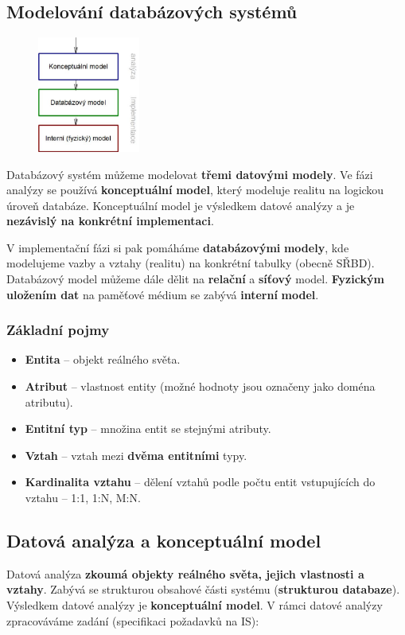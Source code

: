 \subsection{Modelování databázových systémů}
\begin{figure}[H]
	\centering
	\includegraphics[width=0.3\textwidth]{assets/modelovani.png}
\end{figure}

Databázový systém můžeme modelovat \textbf{třemi datovými modely}. Ve fázi analýzy se používá \textbf{konceptuální} \textbf{model}, který modeluje realitu na logickou úroveň databáze. Konceptuální model je výsledkem datové analýzy a je \textbf{nezávislý na konkrétní implementaci}. 

V implementační fázi si pak pomáháme \textbf{databázovými} \textbf{modely}, kde modelujeme vazby a vztahy (realitu) na konkrétní tabulky (obecně SŘBD). Databázový model můžeme dále dělit na \textbf{relační} a \textbf{síťový} model. \textbf{Fyzickým uložením dat} na paměťové médium se zabývá \textbf{interní} \textbf{model}.

\subsubsection{Základní pojmy}
\begin{itemize}
	\item \textbf{Entita} -- objekt reálného světa.
	\item \textbf{Atribut} -- vlastnost entity (možné hodnoty jsou označeny jako doména atributu).
	\item \textbf{Entitní typ} -- množina entit se stejnými atributy.
	\item \textbf{Vztah} -- vztah mezi \textbf{dvěma entitními} typy.
	\item \textbf{Kardinalita vztahu} -- dělení vztahů podle počtu entit vstupujících do vztahu -- 1:1, 1:N, M:N.
\end{itemize}

\subsection{Datová analýza a konceptuální model}
Datová analýza \textbf{zkoumá objekty reálného světa, jejich vlastnosti a vztahy}. Zabývá se strukturou obsahové části systému (\textbf{strukturou databaze}). Výsledkem datové analýzy je \textbf{konceptuální model}. V rámci datové analýzy zpracováváme zadání (specifikaci požadavků na IS):

